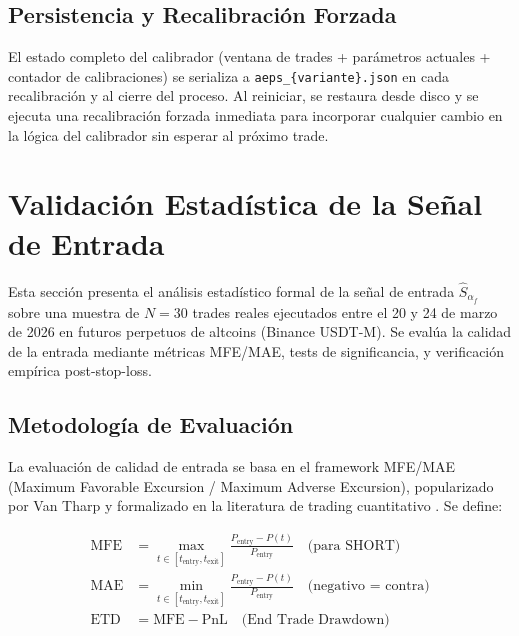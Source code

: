 \documentclass[11pt,a4paper]{article}
\newcommand{\score}{\hat{S}_{\alpha_f}}
\newcommand{\code}[1]{\texttt{\small #1}}
\begin{document}
\subsection{Persistencia y Recalibraci\'on Forzada}

El estado completo del calibrador (ventana de trades + par\'ametros
actuales + contador de calibraciones) se serializa a
\code{aeps\_\{variante\}.json} en cada recalibraci\'on y al
cierre del proceso. Al reiniciar, se restaura desde disco y
se ejecuta una recalibraci\'on forzada inmediata para incorporar
cualquier cambio en la l\'ogica del calibrador sin esperar al
pr\'oximo trade.


\section{Validaci\'on Estad\'istica de la Se\~nal de Entrada}
\label{sec:validation}

Esta secci\'on presenta el an\'alisis estad\'istico formal de la se\~nal
de entrada $\score$ sobre una muestra de $N=30$ trades reales ejecutados
entre el 20 y 24 de marzo de 2026 en futuros perpetuos de altcoins
(Binance USDT-M). Se eval\'ua la calidad de la entrada mediante
m\'etricas MFE/MAE, tests de significancia, y verificaci\'on emp\'irica
post-stop-loss.


\subsection{Metodolog\'ia de Evaluaci\'on}

La evaluaci\'on de calidad de entrada se basa en el framework
MFE/MAE (Maximum Favorable Excursion / Maximum Adverse Excursion),
popularizado por Van Tharp y formalizado en la literatura de
trading cuantitativo \cite{leung2021trailing, filippos2018tpsl}.
Se define:

\begin{align}
\text{MFE} &= \max_{t \in [t_{\text{entry}}, t_{\text{exit}}]}
  \frac{P_{\text{entry}} - P(t)}{P_{\text{entry}}} \quad \text{(para SHORT)} \\
\text{MAE} &= \min_{t \in [t_{\text{entry}}, t_{\text{exit}}]}
  \frac{P_{\text{entry}} - P(t)}{P_{\text{entry}}} \quad \text{(negativo = contra)} \\
\text{ETD} &= \text{MFE} - \text{PnL} \quad \text{(End Trade Drawdown)}
\end{align}
\end{document}
